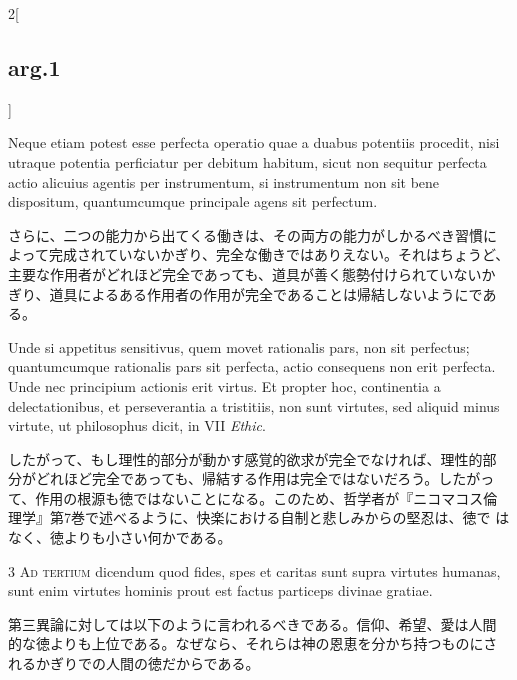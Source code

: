 \documentclass[paper=a4paper,fontsize=10pt,jafontsize=9pt,titlepage]{jlreq}
\begin{document}
\begin{paracol}{2}[\subsection{arg.1}]
\switchcolumn*

Neque etiam potest esse perfecta operatio quae a duabus potentiis
procedit, nisi utraque potentia perficiatur per debitum habitum, sicut
non sequitur perfecta actio alicuius agentis per instrumentum, si
instrumentum non sit bene dispositum, quantumcumque principale agens
sit perfectum.

\switchcolumn

さらに、二つの能力から出てくる働きは、その両方の能力がしかるべき習慣に
よって完成されていないかぎり、完全な働きではありえない。それはちょうど、
主要な作用者がどれほど完全であっても、道具が善く態勢付けられていないか
ぎり、道具によるある作用者の作用が完全であることは帰結しないようにであ
る。

\switchcolumn*

Unde si appetitus sensitivus, quem movet rationalis pars, non sit
perfectus; quantumcumque rationalis pars sit perfecta, actio
consequens non erit perfecta. Unde nec principium actionis erit
virtus. Et propter hoc, continentia a delectationibus, et
perseverantia a tristitiis, non sunt virtutes, sed aliquid minus
virtute, ut philosophus dicit, in VII {\itshape Ethic}.

\switchcolumn

したがって、もし理性的部分が動かす感覚的欲求が完全でなければ、理性的部
分がどれほど完全であっても、帰結する作用は完全ではないだろう。したがっ
て、作用の根源も徳ではないことになる。このため、哲学者が『ニコマコス倫
理学』第7巻で述べるように、快楽における自制と悲しみからの堅忍は、徳で
はなく、徳よりも小さい何かである。

\switchcolumn*[\subsection{ad.3}]

3 {\scshape Ad tertium} dicendum quod fides, spes et caritas sunt
supra virtutes humanas, sunt enim virtutes hominis prout est factus
particeps divinae gratiae.

\switchcolumn

第三異論に対しては以下のように言われるべきである。信仰、希望、愛は人間
的な徳よりも上位である。なぜなら、それらは神の恩恵を分かち持つものにさ
れるかぎりでの人間の徳だからである。

\end{paracol}
\newpage
{}
{}
\setcounter{section}{4}
\setcounter{subsection}{0}
\end{document}
